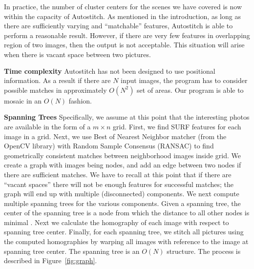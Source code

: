 \documentclass[11pt]{article}
\begin{document}
In practice, the number of cluster centers for the scenes we have
covered is now within the capacity of Autostitch.  As mentioned in the
introduction, as long as there are sufficiently varying and
``matchable'' features, Autostitch is able to perform a reasonable
result.  However, if there are very few features in overlapping region
of two images, then the output is not acceptable. This situation will
arise when there is vacant space between two pictures.

{\bf Time complexity} Autostitch has not been designed
to use positional information. As a result if there are $N$ input
images, the program has to consider possible matches in approximately
$O(N^2)$ set of areas.  Our program is able to mosaic in an $O(N)$
fashion.

{\bf Spanning Trees}
Specifically, we assume at this point that the interesting photos are
available in the form of a $m \times n$ grid. First, we find SURF
\cite{Bay} features for each image in a grid. Next, we use Best of
Nearest Neighbor matcher (from the OpenCV library) with Random Sample
Consensus (RANSAC) \cite{Fischler1981} to find geometrically
consistent matches between neighborhood images inside grid.  We
create a graph with images being nodes, and add an edge between two
nodes if there are sufficient matches. We have to recall at this point
that if there are ``vacant spaces'' there will not be enough features
for successful matches; the graph will end up with multiple
(disconnected) components.  We next compute multiple spanning trees
for the various components. Given a spanning tree, the center of the
spanning tree is a node from which the distance to all other nodes is
minimal \cite{Kocay}. Next we calculate the homography of each image with respect
to spanning tree center.  Finally, for each spanning tree, we stitch
all pictures using the computed homographies by warping all images
with reference to the image at spanning tree center. The spanning tree is
an $O(N)$ structure. The process is described in
Figure~\ref{fig:graph}.
\end{document}
